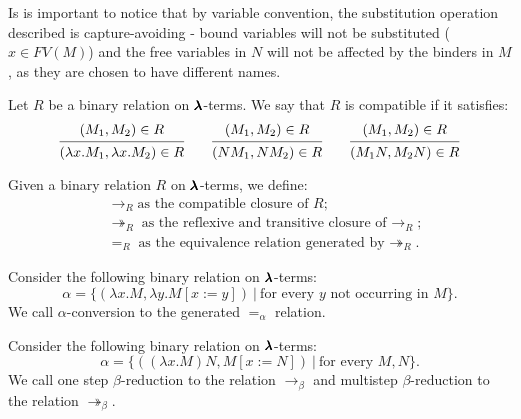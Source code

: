 \begin{remark}
  Is is important to notice that by variable convention, the substitution operation described is capture-avoiding
  - bound variables will not be substituted ($x \in FV(M)$) and the free variables in $N$ will not be affected by the binders in $M$, as they are chosen to have different names. 
\end{remark}

\begin{definition}
  Let $R$ be a binary relation on $\pmb{\lambda}$-terms.
  We say that $R$ is compatible if it satisfies:
  \[
    \begin{prooftree}
      \hypo{ (M_1, M_2) \in R }
      \infer1{ (\lambda x . M_1, \lambda x . M_2) \in R } 
    \end{prooftree}
    \qquad
    \begin{prooftree}
      \hypo{ (M_1, M_2) \in R }
      \infer1{ (N M_1, N M_2) \in R } 
    \end{prooftree}
    \qquad
    \begin{prooftree}
      \hypo{ (M_1, M_2) \in R }
      \infer1{ (M_1 N, M_2 N) \in R }
    \end{prooftree}
  \]
\end{definition}


\begin{notation}
  Given a binary relation $R$ on $\pmb{\lambda}$-terms, we define:
  \begin{align*}
    & \to_R \text{as the compatible closure of $R$} ; \\
    & \twoheadrightarrow_R \text{as the reflexive and transitive closure of $\to_R$} ; \\
    & =_R \text{as the equivalence relation generated by $\twoheadrightarrow_R$}.
  \end{align*}
\end{notation}


\begin{definition}
  Consider the following binary relation on $\pmb{\lambda}$-terms:  
  \[
    \alpha = \{ (\lambda x . M, \lambda y . M[x := y]) \
                | \ \text{for every $y$ not occurring in $M$} \}.
  \]  
  We call $\alpha$-conversion to the generated $=_\alpha$ relation.
\end{definition}


\begin{definition}
  Consider the following binary relation on $\pmb{\lambda}$-terms:  
  \[
    \alpha = \{ ((\lambda x . M) N, M[x := N]) \
                | \ \text{for every $M, N$} \}.
  \]  
  We call one step $\beta$-reduction to the relation $\to_\beta$ and multistep $\beta$-reduction to the relation $\twoheadrightarrow_\beta$.
\end{definition}


